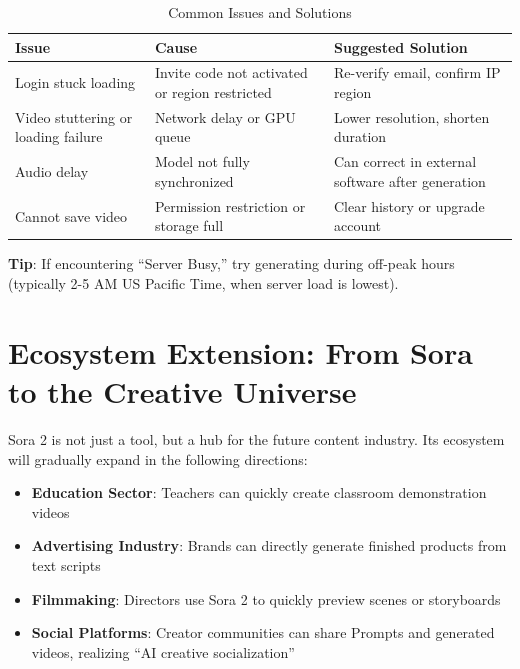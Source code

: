 \begin{table}[H]
\centering
\caption{Common Issues and Solutions \\ \authorillustration}
\label{tab:troubleshooting}
\small
\begin{tabular}{|p{3cm}|p{4cm}|p{5cm}|}
\hline
\textbf{Issue} & \textbf{Cause} & \textbf{Suggested Solution} \\
\hline
Login stuck loading & Invite code not activated or region restricted & Re-verify email, confirm IP region \\
\hline
Video stuttering or loading failure & Network delay or GPU queue & Lower resolution, shorten duration \\
\hline
Audio delay & Model not fully synchronized & Can correct in external software after generation \\
\hline
Cannot save video & Permission restriction or storage full & Clear history or upgrade account \\
\hline
\end{tabular}
\end{table}

\begin{Prompt}
\textbf{Tip}: If encountering ``Server Busy,'' try generating during off-peak hours (typically 2-5 AM US Pacific Time, when server load is lowest).
\end{Prompt}

\section{Ecosystem Extension: From Sora to the Creative Universe}

Sora 2 is not just a tool, but a hub for the future content industry. Its ecosystem will gradually expand in the following directions:

\begin{itemize}
\item \textbf{Education Sector}: Teachers can quickly create classroom demonstration videos
\item \textbf{Advertising Industry}: Brands can directly generate finished products from text scripts
\item \textbf{Filmmaking}: Directors use Sora 2 to quickly preview scenes or storyboards
\item \textbf{Social Platforms}: Creator communities can share Prompts and generated videos, realizing ``AI creative socialization''
\end{itemize}

